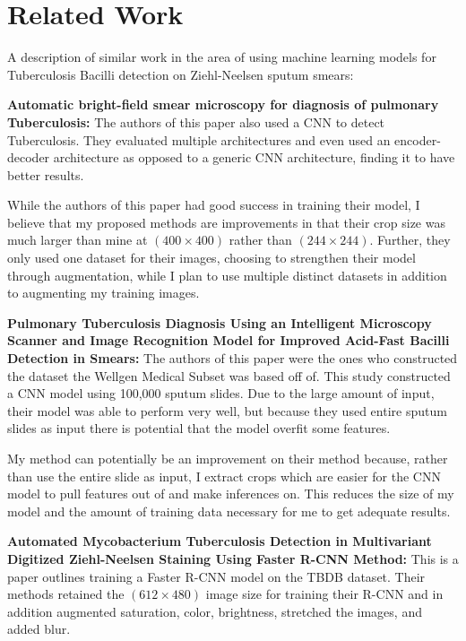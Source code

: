 \documentclass{article}
\begin{document}
\section{Related Work}

A description of similar work in the area of using machine learning models for Tuberculosis Bacilli detection
on Ziehl-Neelsen sputum smears:

\textbf{Automatic bright-field smear microscopy for diagnosis of pulmonary Tuberculosis:}
The authors of this paper also used a CNN to detect Tuberculosis. They evaluated multiple architectures and even used
an encoder-decoder architecture as opposed to a generic CNN architecture, finding it to have better results.

While the authors of this paper had good success in training their model, I believe that my proposed methods are improvements
in that their crop size was much larger than mine at $(400 \times 400)$ rather than $(244 \times 244)$. Further, they only used 
one dataset for their images, choosing to strengthen their model through augmentation, while I plan to use multiple distinct
datasets in addition to augmenting my training images.


\textbf{Pulmonary Tuberculosis Diagnosis Using an Intelligent Microscopy Scanner and Image Recognition Model for Improved Acid-Fast Bacilli Detection in Smears:}
The authors of this paper were the ones who constructed the dataset the Wellgen Medical Subset was based off of. This study
constructed a CNN model using 100,000 sputum slides. Due to the large amount of input, their model was able to perform
very well, but because they used entire sputum slides as input there is potential that the model overfit some features. 

My method can potentially be an improvement on their method because, rather than use the entire slide as input, I extract crops which 
are easier for the CNN model to pull features out of and make inferences on. This reduces the size of my model and the amount of training
data necessary for me to get adequate results.




\textbf{Automated Mycobacterium Tuberculosis Detection in Multivariant Digitized Ziehl-Neelsen Staining Using Faster R-CNN Method:}
This is a paper outlines training a Faster R-CNN model on the TBDB\cite{TBDB} dataset. Their methods retained the $(612 \times 480)$
image size for training their R-CNN and in addition augmented saturation, color, brightness, stretched the images, and added blur. 
\end{document}
